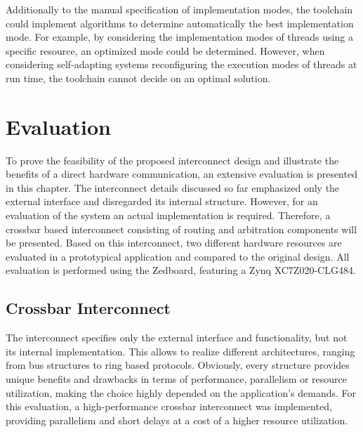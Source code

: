 Additionally to the manual specification of implementation modes, the
toolchain could implement algorithms to determine automatically the best
implementation mode. For example, by considering the implementation modes of
threads using a specific resource, an optimized mode could be determined.
However, when considering self-adapting systems reconfiguring the execution
modes of threads at run time, the toolchain cannot decide on an optimal
solution.

\section{Evaluation}
To prove the feasibility of the proposed interconnect design and illustrate
the benefits of a direct hardware communication, an extensive evaluation is
presented in this chapter. The interconnect details discussed so far
emphasized only the external interface and disregarded its internal structure.
However, for an evaluation of the system an actual implementation is required.
Therefore, a crossbar based interconnect consisting of routing and arbitration
components will be presented. Based on this interconnect, two different
hardware resources are evaluated in a prototypical application and compared to
the original design. All evaluation is performed using the Zedboard, featuring
a Zynq XC7Z020-CLG484.

\subsection{Crossbar Interconnect}
The interconnect specifies only the external interface and functionality, but
not its internal implementation. This allows to realize different
architectures, ranging from bus structures to ring based protocols. Obviously,
every structure provides unique benefits and drawbacks in terms of
performance, parallelism or resource utilization, making the choice highly
depended on the application's demands. For this evaluation, a high-performance
crossbar interconnect was implemented, providing parallelism and short delays
at a cost of a higher resource utilization.

